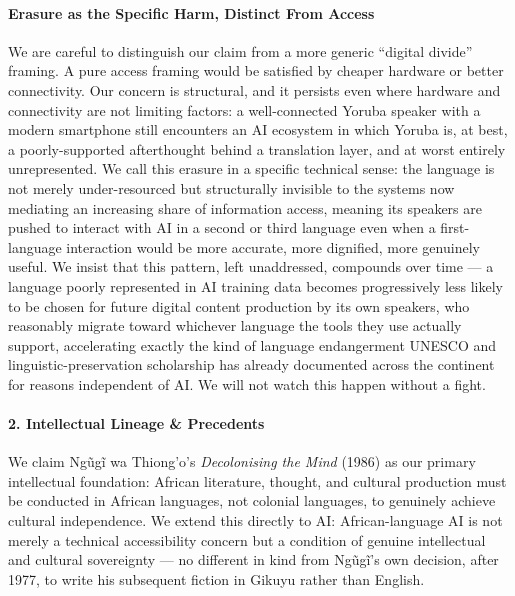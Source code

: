 \paragraph{Erasure as the Specific Harm, Distinct From
Access}\label{erasure-as-the-specific-harm-distinct-from-access}

We are careful to distinguish our claim from a more generic ``digital
divide'' framing. A pure access framing would be satisfied by cheaper
hardware or better connectivity. Our concern is structural, and it
persists even where hardware and connectivity are not limiting factors:
a well-connected Yoruba speaker with a modern smartphone still
encounters an AI ecosystem in which Yoruba is, at best, a
poorly-supported afterthought behind a translation layer, and at worst
entirely unrepresented. We call this erasure in a specific technical
sense: the language is not merely under-resourced but structurally
invisible to the systems now mediating an increasing share of
information access, meaning its speakers are pushed to interact with AI
in a second or third language even when a first-language interaction
would be more accurate, more dignified, more genuinely useful. We insist
that this pattern, left unaddressed, compounds over time --- a language
poorly represented in AI training data becomes progressively less likely
to be chosen for future digital content production by its own speakers,
who reasonably migrate toward whichever language the tools they use
actually support, accelerating exactly the kind of language endangerment
UNESCO and linguistic-preservation scholarship has already documented
across the continent for reasons independent of AI. We will not watch
this happen without a fight.

\paragraph{2. Intellectual Lineage \&
Precedents}\label{intellectual-lineage-precedents-48}

We claim Ngũgĩ wa Thiong'o's \emph{Decolonising the Mind} (1986) as our
primary intellectual foundation: African literature, thought, and
cultural production must be conducted in African languages, not colonial
languages, to genuinely achieve cultural independence. We extend this
directly to AI: African-language AI is not merely a technical
accessibility concern but a condition of genuine intellectual and
cultural sovereignty --- no different in kind from Ngũgĩ's own decision,
after 1977, to write his subsequent fiction in Gikuyu rather than
English.

